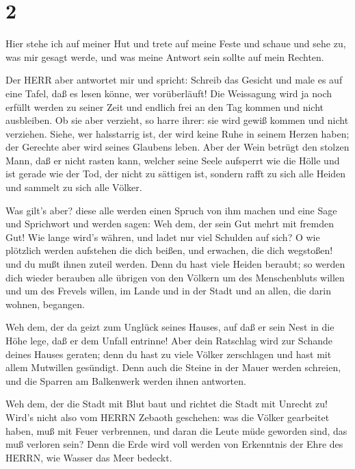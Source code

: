 \hypertarget{section-1}{%
\section{2}\label{section-1}}

 Hier stehe ich auf meiner Hut und trete auf meine Feste und
schaue und sehe zu, was mir gesagt werde, und was meine Antwort sein
sollte auf mein Rechten.

 Der HERR aber antwortet mir und spricht: Schreib das
Gesicht und male es auf eine Tafel, daß es lesen könne, wer
vorüberläuft!  Die Weissagung wird ja noch erfüllt werden zu
seiner Zeit und endlich frei an den Tag kommen und nicht ausbleiben. Ob
sie aber verzieht, so harre ihrer: sie wird gewiß kommen und nicht
verziehen.  Siehe, wer halsstarrig ist, der wird keine Ruhe
in seinem Herzen haben; der Gerechte aber wird seines Glaubens leben.
 Aber der Wein betrügt den stolzen Mann, daß er nicht rasten
kann, welcher seine Seele aufsperrt wie die Hölle und ist gerade wie der
Tod, der nicht zu sättigen ist, sondern rafft zu sich alle Heiden und
sammelt zu sich alle Völker.

 Was gilt's aber? diese alle werden einen Spruch von ihm
machen und eine Sage und Sprichwort und werden sagen: Weh dem, der sein
Gut mehrt mit fremden Gut! Wie lange wird's währen, und ladet nur viel
Schulden auf sich?  O wie plötzlich werden aufstehen die
dich beißen, und erwachen, die dich wegstoßen! und du mußt ihnen zuteil
werden.  Denn du hast viele Heiden beraubt; so werden dich
wieder berauben alle übrigen von den Völkern um des Menschenbluts willen
und um des Frevels willen, im Lande und in der Stadt und an allen, die
darin wohnen, begangen.

 Weh dem, der da geizt zum Unglück seines Hauses, auf daß er
sein Nest in die Höhe lege, daß er dem Unfall entrinne! 
Aber dein Ratschlag wird zur Schande deines Hauses geraten; denn du hast
zu viele Völker zerschlagen und hast mit allem Mutwillen gesündigt.
 Denn auch die Steine in der Mauer werden schreien, und die
Sparren am Balkenwerk werden ihnen antworten.

 Weh dem, der die Stadt mit Blut baut und richtet die Stadt
mit Unrecht zu!  Wird's nicht also vom HERRN Zebaoth
geschehen: was die Völker gearbeitet haben, muß mit Feuer verbrennen,
und daran die Leute müde geworden sind, das muß verloren sein?
 Denn die Erde wird voll werden von Erkenntnis der Ehre des
HERRN, wie Wasser das Meer bedeckt.

